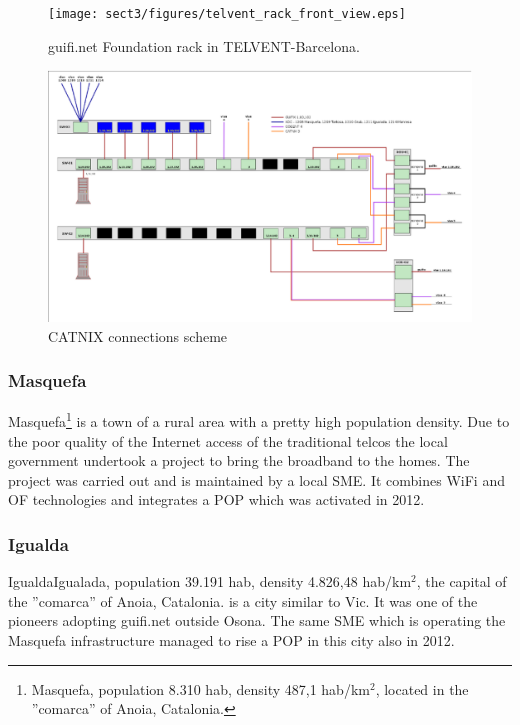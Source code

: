 \begin{figure}[htbp]
  \centering
  \texttt{[image: sect3/figures/telvent\_rack\_front\_view.eps]} 
  \caption{guifi.net Foundation rack in TELVENT-Barcelona.}
  \label{fig:telvent_rack}
\end{figure}


\begin{figure}[htbp]
  \centering
  \includegraphics[scale=.75]{sect3/figures/telvent_scheme.eps} 
  \caption{CATNIX connections scheme}
  \label{fig:telvent_scheme}
\end{figure}


\FloatBarrier
\subsubsection{Masquefa}

Masquefa\footnote{Masquefa, population 8.310 hab, density 487,1 hab/km$^{2}$, located in the ''comarca'' of Anoia, Catalonia.} is a town of a rural area with a pretty high population density. Due to the poor quality of the Internet access of the traditional telcos the local government undertook a project to bring the broadband to the homes. The project was carried out and is maintained by a local SME. It combines WiFi and OF technologies and integrates a POP which was activated in 2012.

\FloatBarrier
\subsubsection{Igualda}

Igualda{Igualada, population 39.191 hab, density 4.826,48 hab/km$^{2}$, the capital of the ''comarca'' of Anoia, Catalonia.} is a city similar to Vic. It was one of the pioneers adopting guifi.net outside Osona. The same SME which is operating the Masquefa infrastructure managed to rise a POP in this city also in 2012.



